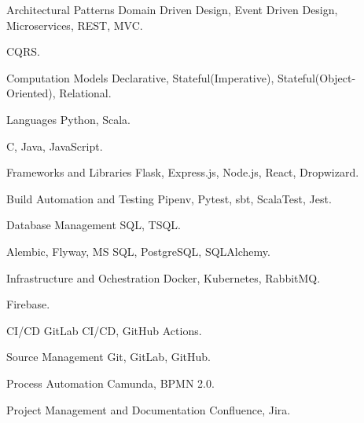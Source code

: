   \begin{cvskills}
    \cvskill
      {Architectural Patterns}
      { Domain Driven Design, Event Driven Design, Microservices, REST, MVC.}

    \cvskill
      {}
      { CQRS.}

    \cvskill
      {Computation Models}
      { Declarative, Stateful(Imperative), Stateful(Object-Oriented), Relational.}

    \cvskill
      {Languages}
      { Python, Scala.}

    \cvskill
      {}
      { C, Java, JavaScript.}

    \cvskill
      {Frameworks and Libraries}
      { Flask, Express.js, Node.js, React, Dropwizard.}

    \cvskill
      {Build Automation and Testing}
      { Pipenv, Pytest, sbt, ScalaTest, Jest.}

    \cvskill
      {Database Management}
      { SQL, TSQL.}

    \cvskill
      {}
      { Alembic, Flyway, MS SQL, PostgreSQL, SQLAlchemy.}

    \cvskill
      {Infrastructure and Ochestration}
      { Docker, Kubernetes, RabbitMQ.}

    \cvskill
      {}
      { Firebase.}

    \cvskill
      {CI/CD}
      { GitLab CI/CD, GitHub Actions.}

    \cvskill
      {Source Management}
      { Git, GitLab, GitHub.}

    \cvskill
      {Process Automation}
      { Camunda, BPMN 2.0.}

    \cvskill
      {Project Management and Documentation}
      { Confluence, Jira.}
  \end{cvskills}
